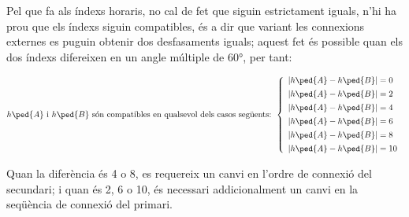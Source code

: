 Pel que fa als índexs horaris, no cal de fet que siguin estrictament iguals, n'hi ha prou  que els índexs siguin compatibles, és a dir que variant les connexions externes es puguin obtenir dos desfasaments iguals; aquest fet és possible quan els dos índexs difereixen en un angle múltiple de \ang{60}, per tant:

\begin{equation}
    h\ped{A} \text{ i } h\ped{B} \text{ són compatibles en qualsevol dels casos següents: }
    \left\{
        \begin{array}{l}
           |h\ped{A} - h\ped{B}| = 0 \\[1ex]
           |h\ped{A} - h\ped{B}| = 2 \\[1ex]
           |h\ped{A} - h\ped{B}| = 4 \\[1ex]
           |h\ped{A} - h\ped{B}| = 6 \\[1ex]
           |h\ped{A} - h\ped{B}| = 8 \\[1ex]
           |h\ped{A} - h\ped{B}| = 10
        \end{array}
    \right.
    \label{eq:index_comp}
\end{equation}

Quan la diferència és 4 o 8, es requereix un canvi en l'ordre de connexió del secundari; i quan és 2, 6 o 10, és necessari addicionalment un canvi en la seqüència de connexió del primari.
	
